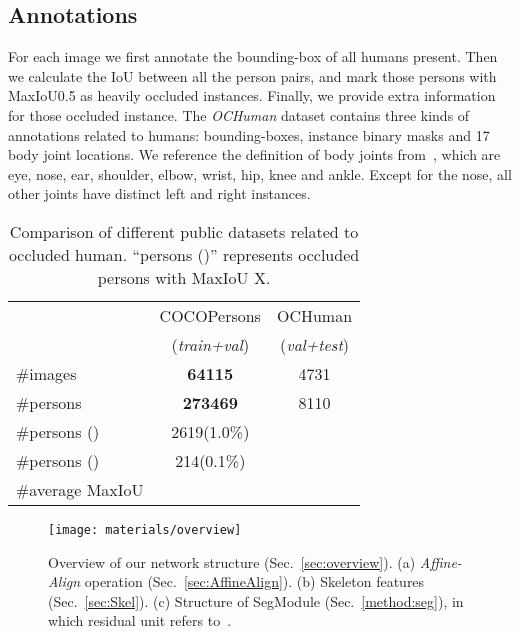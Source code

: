 \documentclass[10pt,twocolumn,letterpaper]{article}
\begin{document}
\subsection{Annotations}
For each image we first annotate the bounding-box of all humans present. Then we calculate the IoU between all the person pairs, and mark those persons with MaxIoU0.5 as heavily occluded instances. Finally, we provide extra information for those occluded instance. The \emph{OCHuman} dataset contains three kinds of annotations related to humans: bounding-boxes, instance binary masks and 17 body joint locations. We reference the definition of body joints from~\cite{lin2014microsoft}, which are eye, nose, ear, shoulder, elbow, wrist, hip, knee and ankle. Except for the nose, all other joints have distinct left and right instances. 

\setlength{\tabcolsep}{10pt}
\begin{table}[t]
\small
\begin{center}
\begin{tabular}{lcc}
\toprule[1.5pt]
 & COCOPersons & OCHuman \\
 & (\emph{train+val}) & (\emph{val+test}) \\
\hline
\#images   & \bf{64115} & 4731  \\
\#persons  & \bf{273469}  & 8110  \\
\#persons ()    & 2619(1.0\%)  &   \\
\#persons ()  & 214(0.1\%)  &   \\
\#average MaxIoU 			   &   &   \\
\bottomrule[1.5pt]
\end{tabular}
\end{center}
\setlength{\abovecaptionskip}{-0.1cm}
\setlength{\belowcaptionskip}{-0.5cm}
\caption{Comparison of different public datasets related to occluded human. ``persons ()'' represents occluded persons with MaxIoU  X.}
\label{table:dataset_statistics}
\end{table}



\begin{figure*}[t]
\centering
\setlength{\abovecaptionskip}{0.1cm}
\setlength{\belowcaptionskip}{-0.5cm}
\texttt{[image: materials/overview]} 
\caption{Overview of our network structure (Sec.~\ref{sec:overview}). (a) \emph{Affine-Align} operation (Sec.~\ref{sec:AffineAlign}). (b) Skeleton features (Sec.~\ref{sec:Skel}). (c) Structure of SegModule (Sec.~\ref{method:seg}), in which residual unit refers to~\cite{he2016deep}.}
\label{fig:structure}
\end{figure*}
\end{document}
